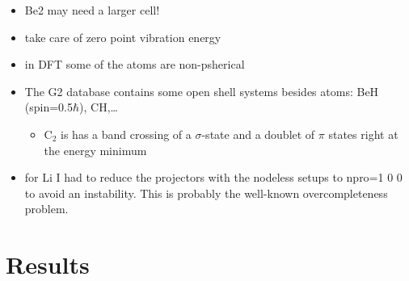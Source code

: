 \documentclass{book}
\begin{document}
\begin{itemize}
\item Be2 may need a larger cell!
\item take care of zero point vibration energy
\item in DFT some of the atoms are non-psherical
\item The G2 database contains some open shell systems besides atoms:
BeH (spin=0.5$\hbar$), CH,\ldots
\begin{itemize}
\item C$_2$ is has a band crossing of a $\sigma$-state and a doublet of
$\pi$ states right at the energy minimum
\end{itemize}
\item for Li I had to reduce the projectors with the nodeless
  setups to npro=1 0 0 to avoid an instability. This is probably
  the well-known overcompleteness problem.
\end{itemize}

\newpage
\section*{Results}
\end{document}
